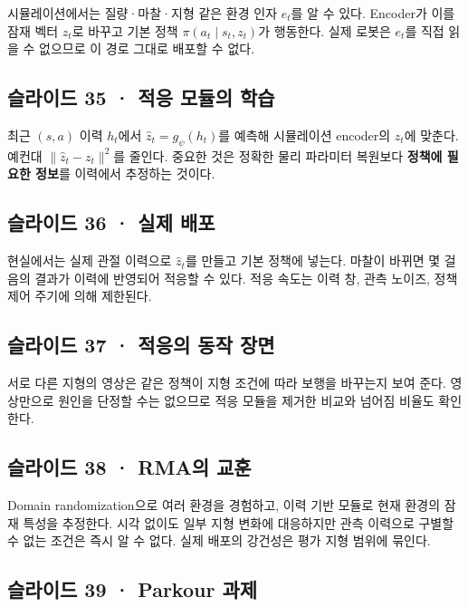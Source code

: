 \documentclass[11pt,a4paper]{article}
\begin{document}
시뮬레이션에서는 질량·마찰·지형 같은 환경 인자 $e_t$를 알 수 있다. Encoder가 이를 잠재 벡터 $z_t$로 바꾸고 기본 정책 $\pi(a_t\mid s_t,z_t)$가 행동한다. 실제 로봇은 $e_t$를 직접 읽을 수 없으므로 이 경로 그대로 배포할 수 없다.\par

\subsection{슬라이드 35 · 적응 모듈의 학습}

최근 $(s,a)$ 이력 $h_t$에서 $\hat z_t=g_\psi(h_t)$를 예측해 시뮬레이션 encoder의 $z_t$에 맞춘다. 예컨대 $\|\hat z_t-z_t\|^2$를 줄인다. 중요한 것은 정확한 물리 파라미터 복원보다 \textbf{정책에 필요한 정보}를 이력에서 추정하는 것이다.\par

\subsection{슬라이드 36 · 실제 배포}

현실에서는 실제 관절 이력으로 $\hat z_t$를 만들고 기본 정책에 넣는다. 마찰이 바뀌면 몇 걸음의 결과가 이력에 반영되어 적응할 수 있다. 적응 속도는 이력 창, 관측 노이즈, 정책 제어 주기에 의해 제한된다.\par

\subsection{슬라이드 37 · 적응의 동작 장면}

서로 다른 지형의 영상은 같은 정책이 지형 조건에 따라 보행을 바꾸는지 보여 준다. 영상만으로 원인을 단정할 수는 없으므로 적응 모듈을 제거한 비교와 넘어짐 비율도 확인한다.\par

\subsection{슬라이드 38 · RMA의 교훈}

Domain randomization으로 여러 환경을 경험하고, 이력 기반 모듈로 현재 환경의 잠재 특성을 추정한다. 시각 없이도 일부 지형 변화에 대응하지만 관측 이력으로 구별할 수 없는 조건은 즉시 알 수 없다. 실제 배포의 강건성은 평가 지형 범위에 묶인다.\par

\subsection{슬라이드 39 · Parkour 과제}
\end{document}
